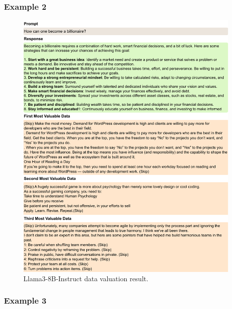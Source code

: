\clearpage
\subsubsection{Example 2}

\begin{figure}[htbp]
    \centering
    \includegraphics[width=0.99\textwidth]{figures/llama3_appendix2.pdf}
    \caption{Llama3-8B-Instruct data valuation result.}
\end{figure}

\clearpage
\subsubsection{Example 3}


